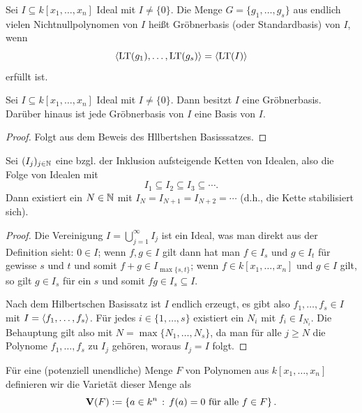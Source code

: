 \documentclass[11pt]{article}
\numberwithin{equation}{section}
\begin{document}
\begin{definition}
	Sei $I \subseteq k[x_1,\ldots,x_n]$ Ideal mit $I \ne \{0\}$. 
	Die Menge $G = \{g_1,\ldots,g_s\}$ aus endlich vielen Nichtnullpolynomen von $I$ heißt Gröbnerbasis (oder Standardbasis) von $I$, wenn \[
		\left< \operatorname{LT}(g_1),\ldots, \operatorname{LT}(g_s) \right> = \left< \operatorname{LT}(I) \right>
	\] erfüllt ist. 
\end{definition} 

\begin{corollary} 
	Sei $I \subseteq k[x_1,\ldots,x_n]$ Ideal mit $I \ne \{0\}$. Dann besitzt $I$ eine Gröbnerbasis. Darüber hinaus ist jede Gröbnerbasis von $I$ eine Basis von $I$. 
\end{corollary} 
\begin{proof} 
	Folgt aus dem Beweis des Hllbertshen Basisssatzes. 
\end{proof} 

\begin{theorem}[ACC $=$ The Ascending Chain Condition $=$ Kettenbedingung für Ideale]
	Sei $(I_j)_{j \in \mathbb{N}}$ eine bzgl. der Inklusion aufsteigende Ketten von Idealen, also die Folge von Idealen mit
	\[	
			I_1 \subseteq I_2 \subseteq I_3 \subseteq \cdots .
	\]
	Dann existiert ein $N \in \mathbb{N}$ mit $I_N = I_{N+1} = I_{N+2} = \cdots$ (d.h., die Kette stabilisiert sich). 
\end{theorem} 
\begin{proof} 
	Die Vereinigung $I = \bigcup_{j=1}^\infty I_j$ ist ein Ideal, was man direkt aus der Definition sieht: $0 \in I$; wenn $f, g \in I$ gilt dann hat man $f \in I_s$ und $g \in I_t$ für gewisse $s$ und $t$ und somit $f+ g \in I_{\max\{s,t\}}$; wenn $f \in k[x_1,\ldots,x_n]$ und $g \in I$ gilt, so gilt $g \in I_s$ für ein $s$ und somit $f g \in I_s \subseteq I$. 
	
	Nach dem Hilbertschen Basissatz ist $I$ endlich erzeugt, es gibt also $f_1,\ldots,f_s \in I$ mit $I = \left< f_1,\ldots,f_s \right>$. Für jedes $i \in \{1,\dots,s\}$ existiert ein $N_i $ mit $f_i \in I_{N_i}$. Die Behauptung gilt also mit $N= \max \{N_1,\ldots,N_s\}$, da man für alle $j \ge N$ die Polynome $f_1,\ldots,f_s $ zu $I_j$ gehören, woraus $I_j = I$ folgt.  
\end{proof} 

\begin{definition} 
	Für eine (potenziell unendliche) Menge $F$ von Polynomen aus $k[x_1,\ldots,x_n]$ definieren wir die Varietät dieser Menge als 
	\[
		\V(F) := \setcond{ a \in k^n}{ f(a) = 0 \ \text{für alle} \ f \in F}. 
	\]
\end{definition} 
\end{document}
